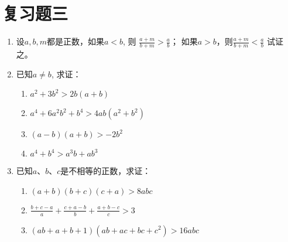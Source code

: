 \section*{复习题三}
\begin{enumerate}
\item   设$a,b,m$都是正数，如果$a<b$, 则
$\frac{a+m}{b+m}>\frac{a}{b}$；
如果$a>b$，则$\frac{a+m}{b+m}<\frac{a}{b}$
试证之。

\item  已知$a\ne b$, 求证：
\begin{multicols}{2}
\begin{enumerate}
    \item $a^2+3b^2>2b(a+b)$
    \item $a^4+6a^2b^2+b^4>4ab(a^2 +b^2)$
    \item $(a-b)(a+b)>-2b^2$
    \item $a^4+b^4>a^3b+ab^3$
\end{enumerate}
\end{multicols}

\item 已知$a$、$b$、$c$是不相等的正数，求证：
\begin{enumerate}
    \item $(a+b)(b+c)(c+a)>8abc$
    \item $\frac{b+c-a}{a}+\frac{c+a-b}{b}+\frac{a+b-c}{c}>3$
    \item $(ab+a+b+1)(ab+ac+bc+c^2)>16abc$
\end{enumerate}


\end{enumerate}
